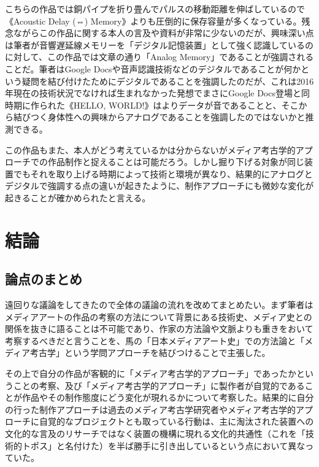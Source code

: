 \documentclass[a4paper,report]{jsbook}
\begin{document}
こちらの作品では銅パイプを折り畳んでパルスの移動距離を伸ばしているので《Acoustic
Delay (⇔)
Memory》よりも圧倒的に保存容量が多くなっている。残念ながらこの作品に関する本人の言及や資料が非常に少ないのだが、興味深い点は筆者が音響遅延線メモリーを「デジタル記憶装置」として強く認識しているのに対して、この作品では文章の通り「Analog
Memory」であることが強調されることだ。筆者はGoogle
Docsや音声認識技術などのデジタルであることが何かという疑問を結び付けたためにデジタルであることを強調したのだが、これは2016年現在の技術状況でなければ生まれなかった発想でまさにGoogle
Docs登場と同時期に作られた《HELLO,
WORLD!》はよりデータが音であることと、そこから結びつく身体性への興味からアナログであることを強調したのではないかと推測できる。\autocites{yunchul:hello}{yunchul:interview}

この作品もまた、本人がどう考えているかは分からないがメディア考古学的アプローチでの作品制作と捉えることは可能だろう。しかし掘り下げる対象が同じ装置でもそれを取り上げる時期によって技術と環境が異なり、結果的にアナログとデジタルで強調する点の違いが起きたように、制作アプローチにも微妙な変化が起きることが確かめられたと言える。

\chapter{結論}\label{ux7d50ux8ad6}

\section{論点のまとめ}\label{ux8ad6ux70b9ux306eux307eux3068ux3081}

遠回りな議論をしてきたので全体の議論の流れを改めてまとめたい。まず筆者はメディアアートの作品の考察の方法について背景にある技術史、メディア史との関係を抜きに語ることは不可能であり、作家の方法論や文脈よりも重きをおいて考察するべきだと言うことを、馬の「日本メディアアート史」での方法論と「メディア考古学」という学問アプローチを結びつけることで主張した。

その上で自分の作品が客観的に「メディア考古学的アプローチ」であったかということの考察、及び「メディア考古学的アプローチ」に製作者が自覚的であることが作品やその制作態度にどう変化が現れるかについて考察した。結果的に自分の行った制作アプローチは過去のメディア考古学研究者やメディア考古学的アプローチに自覚的なプロジェクトとも取っている行動は、主に淘汰された装置への文化的な言及のリサーチではなく装置の機構に現れる文化的共通性（これを「技術的トポス」と名付けた）を半ば勝手に引き出しているという点において異なっていた。
\end{document}
